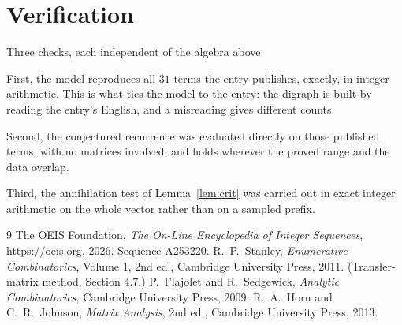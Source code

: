 \documentclass[11pt,a4paper]{article}
\theoremstyle{plain}
\theoremstyle{definition}
\begin{document}
\section{Verification}

Three checks, each independent of the algebra above.

First, the model reproduces all $31$ terms the entry publishes, exactly, in integer
arithmetic. This is what ties the model to the entry: the digraph is built by reading the
entry's English, and a misreading gives different counts.

Second, the conjectured recurrence was evaluated directly on those published terms, with no
matrices involved, and holds wherever the proved range and the data overlap.

Third, the annihilation test of Lemma~\ref{lem:crit} was carried out in exact integer
arithmetic on the whole vector rather than on a sampled prefix.

\begin{thebibliography}{9}
 The OEIS Foundation, \emph{The On-Line Encyclopedia of Integer
Sequences}, \url{https://oeis.org}, 2026. Sequence A253220.
 R.~P.~Stanley, \emph{Enumerative Combinatorics}, Volume 1, 2nd ed.,
Cambridge University Press, 2011. (Transfer-matrix method, Section 4.7.)
 P.~Flajolet and R.~Sedgewick, \emph{Analytic Combinatorics}, Cambridge
University Press, 2009.
 R.~A.~Horn and C.~R.~Johnson, \emph{Matrix Analysis}, 2nd ed., Cambridge
University Press, 2013.
\end{thebibliography}
\end{document}
